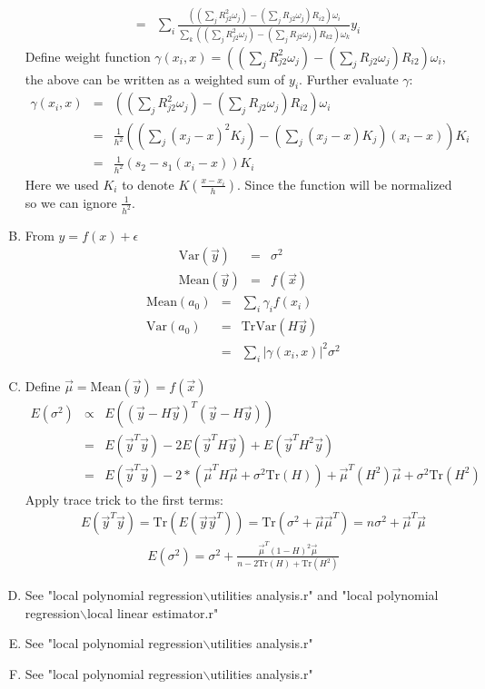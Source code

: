 \documentclass{article}
\begin{document}
\begin{enumerate}[(A)]
\begin{eqnarray}
&=&\sum_i\frac{((\sum_jR_{j2}^2\omega_j)-(\sum_jR_{j2}\omega_j)R_{i2})\omega_i}{\sum_k((\sum_jR_{j2}^2\omega_j)-(\sum_jR_{j2}\omega_j)R_{k2})\omega_k}y_i
\end{eqnarray}
Define weight function $\gamma(x_i,x)=((\sum_jR_{j2}^2\omega_j)-(\sum_jR_{j2}\omega_j)R_{i2})\omega_i$, the above can be written as a weighted sum of $y_i$. Further evaluate $\gamma$:
\begin{eqnarray}
\gamma(x_i,x)&=&((\sum_jR_{j2}^2\omega_j)-(\sum_jR_{j2}\omega_j)R_{i2})\omega_i\nonumber\\
&=&\frac{1}{h^2}((\sum_j(x_j-x)^2K_j)-(\sum_j(x_j-x)K_j)(x_i-x))K_i\nonumber\\
&=&\frac{1}{h^2}(s_2-s_1(x_i-x))K_i
\end{eqnarray}
Here we used $K_i$ to denote $K(\frac{x-x_i}{h})$. Since the function will be normalized so we can ignore $\frac{1}{h^2}$.
\item
From $y=f(x)+\epsilon$
\begin{eqnarray}
\textrm{Var}(\vec{y})&=&\sigma^2\\
\textrm{Mean}(\vec{y})&=&f(\vec{x})
\end{eqnarray}
\begin{eqnarray}
\textrm{Mean}(a_0)&=&\sum_i\gamma_if(x_i)\nonumber\\
\textrm{Var}(a_0)&=&\textrm{Tr}\textrm{Var}(H\vec{y})\nonumber\\
&=&\sum_i|\gamma(x_i,x)|^2\sigma^2
\end{eqnarray}
\item
Define $\vec{\mu}=\textrm{Mean}(\vec{y})=f(\vec{x})$
\begin{eqnarray}
E(\sigma^2)&\propto&E((\vec{y}-H\vec{y})^T(\vec{y}-H\vec{y}))\nonumber\\
&=&E(\vec{y}^T\vec{y})-2E(\vec{y}^TH\vec{y})+E(\vec{y}^TH^2\vec{y})\nonumber\\
&=&E(\vec{y}^T\vec{y})-2*(\vec{\mu}^TH\vec{\mu}+\sigma^2\textrm{Tr}(H))+\vec{\mu}^T(H^2)\vec{\mu}+\sigma^2\textrm{Tr}(H^2)
\end{eqnarray}
Apply trace trick to the first terms:
\begin{eqnarray}
&&E(\vec{y}^T\vec{y})=\textrm{Tr}(E(\vec{y}\vec{y}^T))=\textrm{Tr}(\sigma^2+\vec{\mu}\vec{\mu}^T)=n\sigma^2+\vec{\mu}^T\vec{\mu}
\end{eqnarray}
\begin{eqnarray}
E(\sigma^2)=\sigma^2+\frac{\vec{\mu}^T(1-H)^2\vec{\mu}}{n-2\textrm{Tr}(H)+\textrm{Tr}(H^2)}
\end{eqnarray}
\item
See "local polynomial regression$\backslash$utilities analysis.r" and "local polynomial regression$\backslash$local linear estimator.r"
\item
See "local polynomial regression$\backslash$utilities analysis.r"
\item
See "local polynomial regression$\backslash$utilities analysis.r"
\end{enumerate}
\end{document}
